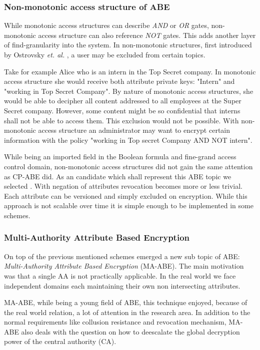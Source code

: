 \subsubsection{Non-monotonic access structure of \ac{ABE}}
While monotonic access structures can describe \textit{AND} or \textit{OR} gates, non-monotonic access structure can also reference \textit{NOT} gates. This adds another layer of find-granularity into the system. In non-monotonic structures, first introduced by Ostrovsky \textit{et. al.} \cite{Ostrovsky:2007:AEN:1315245.1315270}, a user may be excluded from certain topics. 

Take for example Alice who is an intern in the Top Secret company. In monotonic access structure she would receive both attribute private keys: "Intern" and "working in Top Secret Company". By nature of monotonic access structures, she would be able to decipher all content addressed to all employees at the Super Secret company. However, some content might be so confidential that interns shall not be able to access them. This exclusion would not be possible. With non-monotonic access structure an administrator may want to encrypt certain information with the policy "working in Top secret Company AND NOT intern".  

While being an imported field in the Boolean formula and fine-grand access control domain, non-monotonic access structures did not gain the same attention as \ac{CP-ABE} did. As an candidate which shall represent this \ac{ABE} topic we selected \cite{10.1007/978-3-642-54631-0_16}. With negation of attributes revocation becomes more or less trivial. Each attribute can be versioned and simply excluded on encryption. While this approach is not scalable over time it is simple enough to be implemented in some schemes.   

\subsubsection{Multi-Authority Attribute Based Encryption}
On top of the previous mentioned schemes emerged a new sub topic of \ac{ABE}: \textit{Multi-Authority Attribute Based Encryption} (\ac{MA-ABE}). The main motivation was that a single \ac{AA} is not practically applicable. In the real world we face independent domains each maintaining their own non intersecting attributes. 

\ac{MA-ABE}, while being a young field of \ac{ABE}, this technique enjoyed, because of the real world relation, a lot of attention in the research area. In addition to the normal requirements like collusion resistance and revocation mechanism, \ac{MA-ABE} also deals with the question on how to deescalate the global decryption power of the central authority (\ac{CA}). 

